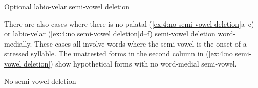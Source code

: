 \ea\label{ex:4:optional labio-velar semi-vowels}
{Optional labio-velar semi-vowel deletion}

    \z
\z

There are also cases where there is no palatal (\ref{ex:4:no semi-vowel deletion}a--c) or labio-velar (\ref{ex:4:no semi-vowel deletion}d--f) semi-vowel deletion word-medially. These cases all involve words where the semi-vowel is the onset of a stressed syllable. The unattested forms in the second column in (\ref{ex:4:no semi-vowel deletion}) show hypothetical forms with no word-medial semi-vowel.

\ea\label{ex:4:no semi-vowel deletion}
{No semi-vowel deletion}


